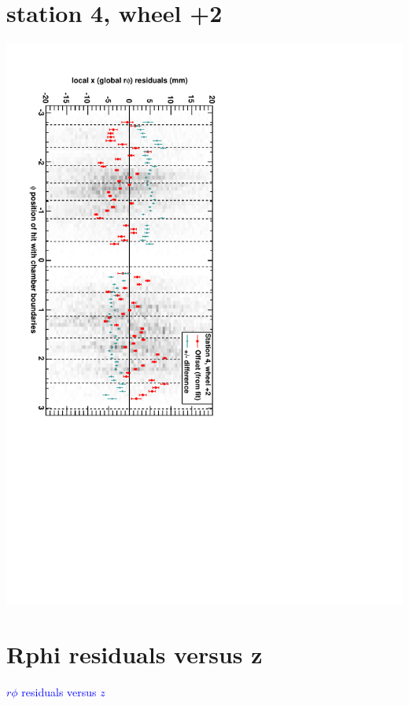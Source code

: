 \documentclass[compress]{beamer}
\begin{document}
\section*{station 4, wheel +2}
\begin{frame} \vfill \mbox{\hspace{-1 cm}\includegraphics[height=1.2\linewidth, angle=90]{DTrphiVsPhi_st4_whE.pdf}} \end{frame}

\section*{Rphi residuals versus z}
\begin{frame}
\begin{center}
\Huge \textcolor{blue}{$r\phi$ residuals versus $z$}
\end{center}
\end{frame}
\end{document}
